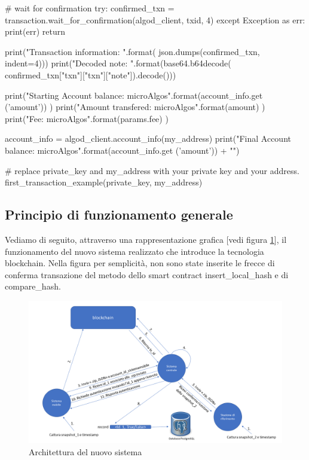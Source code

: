 \begin{pythoncode}
    # wait for confirmation 
    try:
        confirmed_txn = transaction.wait_for_confirmation(algod_client, txid, 4)  
    except Exception as err:
        print(err)
        return

    print("Transaction information: {}".format(
        json.dumps(confirmed_txn, indent=4)))
    print("Decoded note: {}".format(base64.b64decode(
        confirmed_txn["txn"]["txn"]["note"]).decode()))

    print("Starting Account balance: {} microAlgos".format(account_info.get
    ('amount')) )
    print("Amount transfered: {} microAlgos".format(amount) )    
    print("Fee: {} microAlgos".format(params.fee) ) 


    account_info = algod_client.account_info(my_address)
    print("Final Account balance: {} microAlgos".format(account_info.get
    ('amount')) + "\n")

# replace private_key and my_address with your private key and your address.
first_transaction_example(private_key, my_address)
\end{pythoncode}

\subsection{Principio di funzionamento generale}
Vediamo di seguito, attraverso una rappresentazione grafica [vedi figura \ref{fig: architetturasistema }], il funzionamento del nuovo sistema realizzato che introduce la tecnologia blockchain. Nella figura per semplicità, non sono state inserite le frecce di conferma transazione del metodo dello smart contract insert\_local\_hash e di compare\_hash.

\begin{figure}[!h]
\centering
\includegraphics[scale=0.5]{images/schema progetto con blockchain v2.png}
\caption{Architettura del nuovo sistema}
\label{fig: architetturasistema }
\end{figure}

